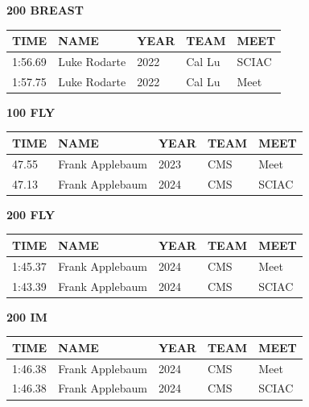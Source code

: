 \begin{table}[H]
\centering
\begin{minipage}[t]{0.48\textwidth}
\centering
\textbf{200 BREAST}\\[0.1cm]
\begin{tabular}{@{}p{1.8cm}p{2.8cm}p{1.2cm}p{1.4cm}p{1.4cm}@{}}
\hline
    \textbf{TIME} & \textbf{NAME} & \textbf{YEAR} & \textbf{TEAM} & \textbf{MEET} \\
\hline
    1:56.69 & Luke Rodarte & 2022 & Cal Lu & SCIAC \\
    1:57.75 & Luke Rodarte & 2022 & Cal Lu & Meet \\
\hline
\end{tabular}
\end{minipage}\hfill
\begin{minipage}[t]{0.48\textwidth}
\centering
\textbf{100 FLY}\\[0.1cm]
\begin{tabular}{@{}p{1.8cm}p{2.8cm}p{1.2cm}p{1.4cm}p{1.4cm}@{}}
\hline
    \textbf{TIME} & \textbf{NAME} & \textbf{YEAR} & \textbf{TEAM} & \textbf{MEET} \\
\hline
    47.55 & Frank Applebaum & 2023 & CMS & Meet \\
    47.13 & Frank Applebaum & 2024 & CMS & SCIAC \\
\hline
\end{tabular}
\end{minipage}
\end{table}

\begin{table}[H]
\centering
\begin{minipage}[t]{0.48\textwidth}
\centering
\textbf{200 FLY}\\[0.1cm]
\begin{tabular}{@{}p{1.8cm}p{2.8cm}p{1.2cm}p{1.4cm}p{1.4cm}@{}}
\hline
    \textbf{TIME} & \textbf{NAME} & \textbf{YEAR} & \textbf{TEAM} & \textbf{MEET} \\
\hline
    1:45.37 & Frank Applebaum & 2024 & CMS & Meet \\
    1:43.39 & Frank Applebaum & 2024 & CMS & SCIAC \\
\hline
\end{tabular}
\end{minipage}\hfill
\begin{minipage}[t]{0.48\textwidth}
\centering
\textbf{200 IM}\\[0.1cm]
\begin{tabular}{@{}p{1.8cm}p{2.8cm}p{1.2cm}p{1.4cm}p{1.4cm}@{}}
\hline
    \textbf{TIME} & \textbf{NAME} & \textbf{YEAR} & \textbf{TEAM} & \textbf{MEET} \\
\hline
    1:46.38 & Frank Applebaum & 2024 & CMS & Meet \\
    1:46.38 & Frank Applebaum & 2024 & CMS & SCIAC \\
\hline
\end{tabular}
\end{minipage}
\end{table}

